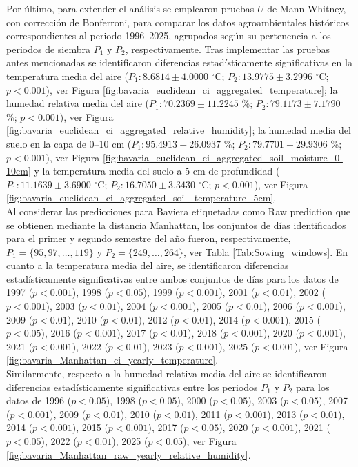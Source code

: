 Por último, para extender el análisis se emplearon pruebas $U$ de Mann-Whitney, con corrección de Bonferroni, para comparar los datos agroambientales históricos correspondientes al periodo 1996--2025, agrupados según su pertenencia a los periodos de siembra $P_1$ y $P_2$, respectivamente.  Tras implementar las pruebas antes mencionadas se identificaron diferencias estadísticamente significativas en la temperatura media del aire ($P_1:	8.6814	\pm	4.0000	$ $^\circ$C; 	$P_2:	13.9775	\pm	3.2996	$ $^\circ$C; 	$p<0.001$), ver Figura \ref{fig:bavaria_euclidean_ci_aggregated_temperature}; la humedad relativa media del aire ($P_1:	70.2369	\pm	11.2245	$ \%; 	$P_2:	79.1173	\pm	7.1790$ \%; 	$p<0.001$), ver Figura \ref{fig:bavaria_euclidean_ci_aggregated_relative_humidity}; la humedad media del suelo en la capa de 0--10 cm ($P_1:	95.4913	\pm	26.0937	$ \%; 	$P_2:	79.7701	\pm	29.9306	$ \%; 	$p<0.001$), ver Figura \ref{fig:bavaria_euclidean_ci_aggregated_soil_moisture_0-10cm} y la temperatura media del suelo a 5 cm de profundidad ($P_1:	11.1639	\pm	3.6900	$ $^\circ$C; 	$P_2:	16.7050	\pm	3.3430	$ $^\circ$C; 	$p<0.001$), ver Figura \ref{fig:bavaria_euclidean_ci_aggregated_soil_temperature_5cm}.\\

Al considerar las predicciones para Baviera etiquetadas como Raw prediction que se obtienen mediante la distancia Manhattan,  los conjuntos de días identificados para el primer y segundo semestre del año fueron, respectivamente, $P_1=\{95,97,\ldots, 119\}$ y $P_2=\{249,\ldots,264\}$, ver Tabla \ref{Tab:Sowing_windows}. En cuanto a la temperatura media del aire, se identificaron diferencias estadísticamente significativas entre ambos conjuntos de días para los datos de 1997	($p<0.001$), 1998	($p<0.05$), 1999	($p<0.001$), 2001	($p<0.01$), 2002	($p<0.001$), 2003	($p<0.01$), 2004	($p<0.001$), 2005	($p<0.01$), 2006	($p<0.001$), 2009	($p<0.01$), 2010	($p<0.01$), 2012	($p<0.01$), 2014	($p<0.001$), 2015	($p<0.05$), 2016	($p<0.001$), 2017	($p<0.01$), 2018	($p<0.001$), 2020	($p<0.001$), 2021	($p<0.001$), 2022	($p<0.01$), 2023	($p<0.001$), 2025	($p<0.001$), ver Figura \ref{fig:bavaria_Manhattan_ci_yearly_temperature}.\\


Similarmente, respecto a la humedad relativa media del aire se identificaron diferencias estadísticamente significativas entre los periodos $P_1$ y $P_2$ para los datos de 1996	($p<0.05$), 1998	($p<0.05$), 2000	($p<0.05$), 2003	($p<0.05$), 2007	($p<0.001$), 2009	($p<0.01$), 2010	($p<0.01$), 2011	($p<0.001$), 2013	($p<0.01$), 2014	($p<0.001$), 2015	($p<0.001$), 2017	($p<0.05$), 2020	($p<0.001$), 2021	($p<0.05$), 2022	($p<0.01$), 2025	($p<0.05$), ver Figura \ref{fig:bavaria_Manhattan_raw_yearly_relative_humidity}.\\

